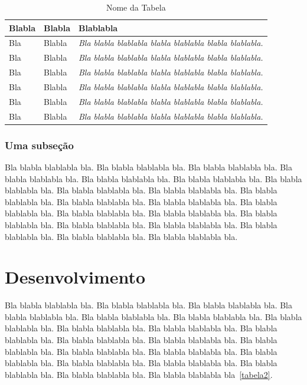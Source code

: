 \documentclass[tese,capa]{texufpel}
\begin{document}
\begin{table}
  \begin{center}
    \caption{Nome da Tabela}\label{tabela}
    \begin{tabular}{p{4cm}p{5cm}p{6cm}}
      \hline
      Blabla & Blabla & Blablabla\\
      \hline
      {\small Bla} & {\small Blabla} & {\small\em Bla blabla blablabla blabla
        blablabla blabla blablabla.}\\
      {\small Bla} & {\small Blabla} & {\small\em Bla blabla blablabla blabla
        blablabla blabla blablabla.}\\
      {\small Bla} & {\small Blabla} & {\small\em Bla blabla blablabla blabla
        blablabla blabla blablabla.}\\
      {\small Bla} & {\small Blabla} & {\small\em Bla blabla blablabla blabla
        blablabla blabla blablabla.}\\
      {\small Bla} & {\small Blabla} & {\small\em Bla blabla blablabla blabla
        blablabla blabla blablabla.}\\
      {\small Bla} & {\small Blabla} & {\small\em Bla blabla blablabla blabla
        blablabla blabla blablabla.}\\
      \hline
    \end{tabular}
  \end{center}
\end{table}

\subsection{Uma subseção}

Bla blabla blablabla bla.  Bla blabla blablabla bla.  Bla blabla
blablabla bla.  Bla blabla blablabla bla.  Bla blabla blablabla bla.
Bla blabla blablabla bla.  Bla blabla blablabla bla.  Bla blabla
blablabla bla.  Bla blabla blablabla bla.  Bla blabla blablabla bla.
Bla blabla blablabla bla.  Bla blabla blablabla bla.  Bla blabla
blablabla bla.  Bla blabla blablabla bla.  Bla blabla blablabla bla.
Bla blabla blablabla bla.  Bla blabla blablabla bla.  Bla blabla
blablabla bla.  Bla blabla blablabla bla.  Bla blabla blablabla bla.
Bla blabla blablabla bla.

\chapter{Desenvolvimento}

  Bla blabla blablabla bla.  Bla blabla blablabla bla.  Bla blabla
  blablabla bla.  Bla blabla blablabla bla.  Bla blabla blablabla bla.
  Bla blabla blablabla bla.  Bla blabla blablabla bla.  Bla blabla
  blablabla bla.  Bla blabla blablabla bla.  Bla blabla blablabla bla.
  Bla blabla blablabla bla.  Bla blabla blablabla bla.  Bla blabla
  blablabla bla.  Bla blabla blablabla bla.  Bla blabla blablabla bla.
  Bla blabla blablabla bla.  Bla blabla blablabla bla.  Bla blabla
  blablabla bla.  Bla blabla blablabla bla.  Bla blabla blablabla bla.
  Bla blabla blablabla bla~\ref{tabela2}.
\end{document}
